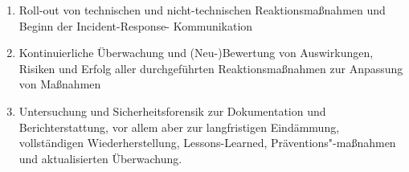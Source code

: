 \begin{enumerate}
    \item Roll-out von technischen und nicht-technischen Reaktionsmaßnahmen und Beginn der Incident-Response-
    Kommunikation
    \item Kontinuierliche Überwachung und (Neu-)Bewertung von Auswirkungen, Risiken und Erfolg aller 
    durchgeführten Reaktionsmaßnahmen zur Anpassung von Maßnahmen
    \item Untersuchung und Sicherheitsforensik zur Dokumentation und Berichterstattung, vor allem aber zur 
    langfristigen Eindämmung, vollständigen Wiederherstellung, Lessons-Learned, Präventions"-maßnahmen und 
    aktualisierten Überwachung.
\end{enumerate}